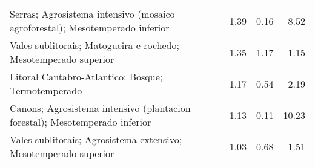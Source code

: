 \begin{table}[p]
\begin{tabular}{lrrr}
  Serras; Agrosistema intensivo (mosaico agroforestal); Mesotemperado inferior & 1.39 & 0.16 & 8.52 \\ 
  Vales sublitorais; Matogueira e rochedo; Mesotemperado superior & 1.35 & 1.17 & 1.15 \\ 
  Litoral Cantabro-Atlantico; Bosque; Termotemperado & 1.17 & 0.54 & 2.19 \\ 
  Canons; Agrosistema intensivo (plantacion forestal); Mesotemperado inferior & 1.13 & 0.11 & 10.23 \\ 
  Vales sublitorais; Agrosistema extensivo; Mesotemperado superior & 1.03 & 0.68 & 1.51 \\ 
   \hline
\end{tabular}
\end{table}
